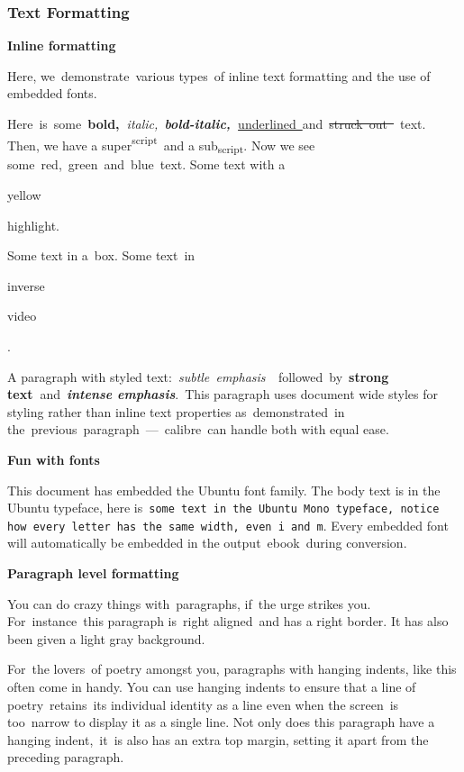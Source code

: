 \documentclass[\officeparserdriver aspectratio=169,12pt,xcolor=table]{beamer}
\providecommand{\ophlaaaaaa}[1]{{\setlength{\fboxsep}{1pt}\colorbox{hex000000}{\strut #1}}}
\providecommand{\ophlppppaa}[1]{{\setlength{\fboxsep}{1pt}\colorbox{hexFFFF00}{\strut #1}}}
\begin{document}
\begin{frame}[allowframebreaks]
\frametitle{\protect\textcolor{hex365F91}{Text Formatting}}
\label{text-formatting}
\textcolor{hex4F81BD}{\textbf{{\fontsize{13pt}{15.6pt}\selectfont Inline formatting}}}

\textcolor{hex000000}{Here, we~demonstrate~various types~of inline text formatting and the use of embedded fonts.}

\textcolor{hex000000}{Here~is~some~}\textcolor{hex000000}{\textbf{bold,~}}\textcolor{hex000000}{\textit{italic,~}}\textcolor{hex000000}{\textit{\textbf{bold-italic,~}}}\textcolor{hex000000}{\uline{underlined~}}\textcolor{hex000000}{and~}\textcolor{hex000000}{\sout{struck~out~}}\textcolor{hex000000}{~text. Then, we have a super}\textcolor{hex000000}{\textsuperscript{script}}\textcolor{hex000000}{~and a sub}\textcolor{hex000000}{\textsubscript{script}}\textcolor{hex000000}{. Now we see some~}\textcolor{hexFF0000}{red}\textcolor{hex000000}{,~}\textcolor{hex92D050}{green}\textcolor{hex000000}{~and~}\textcolor{hex0070C0}{blue}\textcolor{hex000000}{~text. Some text with a~}\textcolor{hex000000}{\ophlppppaa{yellow} \ophlppppaa{highlight.}}\textcolor{hex000000}{ Some text in a~box. Some text~in~}\textcolor{hexFFFFFF}{\ophlaaaaaa{inverse} \ophlaaaaaa{video}}\textcolor{hex000000}{.}

\textcolor{hex000000}{A paragraph with styled text:~}\textcolor{hex808080}{\textit{subtle~emphasis~~}}\textcolor{hex000000}{followed~by~}\textcolor{hex000000}{\textbf{strong text~}}\textcolor{hex000000}{and~}\textcolor{hex4F81BD}{\textit{\textbf{intense emphasis}}}\textcolor{hex000000}{.~This paragraph uses document wide styles for styling rather than inline text properties as~demonstrated~in the~previous~paragraph~—~calibre~can handle both with equal ease.}

\textcolor{hex4F81BD}{\textbf{{\fontsize{13pt}{15.6pt}\selectfont Fun with fonts}}}

\textcolor{hex000000}{This document has embedded the Ubuntu font family. The body text is in the Ubuntu typeface, here is~}\textcolor{hex000000}{\texttt{some text in the Ubuntu Mono typeface, notice how every letter has the same width, even~i~and m}}\textcolor{hex000000}{. Every embedded font will automatically be embedded in the output~ebook~during conversion.~}

\textcolor{hex4F81BD}{\textbf{{\fontsize{13pt}{15.6pt}\selectfont Paragraph level formatting}}}

{\raggedleft \textcolor{hex000000}{You can do crazy things with~paragraphs, if~the urge strikes you. For~instance~this paragraph is~right aligned~and has a right border. It has also been given a light gray background.}\par}

\textcolor{hex000000}{For~the lovers~of poetry amongst you, paragraphs with hanging indents, like this often come in handy. You can use hanging indents to ensure that a line of poetry~retains~its individual identity as a line even when the screen~is~ too~narrow to display it as a single line. Not only does this paragraph have a hanging indent,~it~is also has an extra top margin, setting it apart from the preceding paragraph.}
\end{frame}
\end{document}
